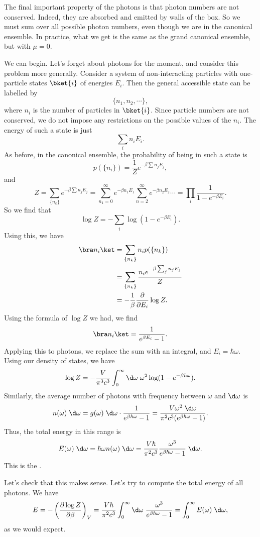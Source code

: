 \documentclass[a4paper]{article}
\begin{document}
The final important property of the photons is that photon numbers are not conserved. Indeed, they are absorbed and emitted by walls of the box. So we must sum over all possible photon numbers, even though we are in the canonical ensemble. In practice, what we get is the same as the grand canonical ensemble, but with $\mu = 0$.

We can begin. Let's forget about photons for the moment, and consider this problem more generally. Consider a system of non-interacting particles with one-particle states $\bket{i}$ of energies $E_i$. Then the general accessible state can be labelled by
\[
  \{n_1, n_2, \cdots\},
\]
where $n_i$ is the number of particles in $\bket{i}$. Since particle numbers are not conserved, we do not impose any restrictions on the possible values of the $n_i$. The energy of such a state is just
\[
  \sum_i n_i E_i.
\]
As before, in the canonical ensemble, the probability of being in such a state is
\[
  p(\{n_i\}) = \frac{1}{Z} e^{-\beta \sum n_j E_j},
\]
and
\[
  Z = \sum_{\{n_k\}} e^{-\beta \sum n_j E_j} = \sum_{n_1 = 0}^\infty e^{-\beta n_1 E_1} \sum_{n = 2}^\infty e^{-\beta n_2 E_2} \cdots = \prod_i \frac{1}{1 - e^{-\beta E_i}}.
\]
So we find that
\[
  \log Z = - \sum_i \log (1 - e^{-\beta E_i}).
\]
Using this, we have
\begin{align*}
  \bra n_i\ket &= \sum_{\{n_k\}} n_i p (\{n_k\}) \\
  &= \sum_{\{n_k\}} \frac{n_i e^{-\beta \sum_j n_j E_j}}{Z}\\
  &= - \frac{1}{\beta} \frac{\partial}{\partial E_i} \log Z.
\end{align*}
Using the formula of $\log Z$ we had, we find
\[
  \bra n_i\ket = \frac{1}{e^{\beta E_i} - 1}.
\]
Applying this to photons, we replace the sum with an integral, and $E_i = \hbar \omega$. Using our density of states, we have
\[
  \log Z = - \frac{V}{\pi^3 c^3} \int_0^\infty \d \omega\; \omega^2 \log(1 - e^{-\beta \hbar \omega}).
\]
Similarly, the average number of photons with frequency between $\omega$ and $\d \omega$ is
\[
  n(\omega)\; \d \omega = g(\omega) \;\d \omega \cdot \frac{1}{e^{\beta \hbar \omega} - 1} = \frac{V \omega^2\;\d \omega}{\pi^2 c^3(e^{\beta\hbar\omega} - 1)}.
\]
Thus, the total energy in this range is
\[
  E(\omega) \;\d \omega = \hbar \omega n(\omega) \;\d \omega = \frac{V \hbar}{\pi^2 c^3} \frac{\omega^3}{e^{\beta \hbar \omega} - 1}\;\d \omega.
\]
This is the .

Let's check that this makes sense. Let's try to compute the total energy of all photons. We have
\[
  E = -\left(\frac{\partial \log Z}{\partial \beta}\right)_V = \frac{V \hbar}{\pi^2 c^3}\int_0^\infty \d \omega\; \frac{\omega^3}{e^{\beta \hbar \omega} - 1} = \int_0^\infty E(\omega) \;\d \omega,
\]
as we would expect.
\end{document}
